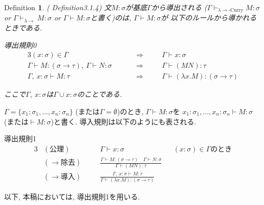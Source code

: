 \documentclass[11pt]{jsreport}
\theoremstyle{mystyle}
\newtheorem{df}{$\textrm{Definition}$}[subsection]
\newcommand{\lama}{\lambda \! \! \to}
\newcommand{\0}{\textbf{0}}
\newcommand{\1}{\textbf{1}}
\newcommand{\2}{\textbf{2}}
\begin{document}
\begin{shadebox}
  \begin{df}{(\cite{Bar} Definition3.1.4)}
    文$M \colon \sigma$が基底$\Gamma$から導出される
    ($\Gamma \vdash_{\lama\text{-Curry}} M \colon \sigma$ or 
    $\Gamma \vdash_{\lama} M \colon \sigma$ or 
    $\Gamma \vdash M \colon \sigma$と書く)のは, $\Gamma \vdash M \colon \sigma$が
    以下のルールから導かれるときである. 
    \begin{itembox}[c]{導出規則0}
      \begin{alignat*}{3}
  (x \colon \sigma) \in \Gamma &\quad& &\Rightarrow& \quad
    &\Gamma \vdash x \colon \sigma \\
  \Gamma \vdash M \colon (\sigma \to \tau),\ \Gamma \vdash N \colon \sigma &&
    &\Rightarrow& &\Gamma \vdash (MN) \colon \tau \\
  \Gamma,\ x \colon \sigma \vdash M \colon \tau && &\Rightarrow& 
    &\Gamma \vdash (\lambda x . M) \colon (\sigma \to \tau) 
      \end{alignat*}
    \end{itembox}
    ここで$\Gamma ,\ x \colon \sigma$は$\Gamma \cup x \colon \sigma$のことである.
  \end{df}
\end{shadebox}
$\Gamma = \{ x_1 \colon \sigma_1 , \ldots , x_n \colon \sigma_n\}$
(または$\Gamma = \emptyset$)のとき, $\Gamma \vdash M \colon \sigma$を
$x_1 \colon \sigma_1 , \ldots , x_n \colon \sigma_n \vdash M \colon \sigma$
(または$\vdash M \colon \sigma$)と書く. 
導入規則は以下のようにも表される.
\begin{itembox}[c]{導出規則1}
  \begin{alignat*}{3}
    &(\text{公理})& \quad &\Gamma \vdash x \colon \sigma& 
      &(x \colon \sigma) \in \Gamma \text{のとき}\\
    &(\text{$\to$除去})& 
      &\frac{\Gamma \vdash M \colon (\sigma \to \tau) \quad
        \Gamma \vdash N \colon \sigma}{\Gamma \vdash (MN) \colon \tau}& & \\
    &(\text{$\to$導入})& &\frac{\Gamma,\ x \colon \sigma \vdash M \colon \tau}
      {\Gamma \vdash (\lambda x . M) \colon (\sigma \to \tau)}& &
  \end{alignat*}
\end{itembox}
以下, 本稿においては, 導出規則1を用いる.
\end{document}

